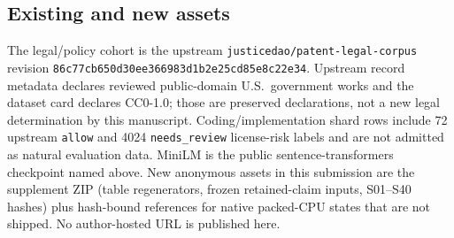 \subsection{Existing and new assets}
\label{app:assets}
The legal/policy cohort is the upstream
\texttt{justicedao/patent-legal-corpus} revision
\texttt{86c77cb650d30ee366983d1b2e25cd85e8c22e34}. Upstream record metadata
declares reviewed public-domain U.S.\ government works and the dataset card
declares CC0-1.0; those are preserved declarations, not a new legal
determination by this manuscript. Coding/implementation shard rows include 72
upstream \texttt{allow} and 4024 \texttt{needs\_review} license-risk labels
and are not admitted as natural evaluation data. MiniLM is the public
sentence-transformers checkpoint named above. New anonymous assets in this
submission are the supplement ZIP (table regenerators, frozen retained-claim
inputs, S01--S40 hashes) plus hash-bound references for native packed-CPU
states that are not shipped. No author-hosted URL is published here.
